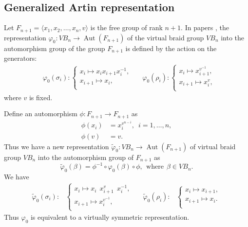 \documentclass[11 pt, reqno]{amsart}
\theoremstyle{definition}
\numberwithin{equation}{subsection}
\newcommand{\Aut}{\operatorname{Aut}}
\begin{document}

\subsection{Generalized Artin representation}\label{SS: Generalized Artin representation}

Let $F_{n+1} =\langle x_1, x_2, \ldots,x_n, v \rangle$ is the free group of rank $n+1$.
In papers \cite{Bar-1,Man}, the representation  $\varphi_0: VB_n \rightarrow \Aut(F_{n+1})$
of the virtual braid group $VB _n$ into the automorphism group of the group $F_{n+1}$ is defined by the action on the generators:
\begin{align*}
&\varphi_0(\sigma_i) :
\left\{
\begin{array}{l}
  x_i \mapsto  x_i x_{i+1} x_i^{-1}, \\
  x_{i+1} \mapsto x_i,  \\
\end{array}
\right.~~~
&\varphi_0(\rho_i) :
\left\{
\begin{array}{l}
  x_i \mapsto  x_{i+1}^{v^{-1}}, \\
  x_{i+1} \mapsto x_i^{v},  \\
\end{array}
\right.
\end{align*}
where $v$ is fixed.

Define an automorphism $\phi: F_{n+1} \to F_{n+1}$ as
\begin{align*}
\phi(x_i)&=x_i ^{v^{n-i}},\,\,\, i=1,\ldots,n,\\
\phi(v)&=v.
\end{align*}
Thus we have a new representation $\tilde{\varphi}_0: VB_n \to \Aut(F_{n+1})$ of virtual braid group $VB_n$ into the automorphism group of $F_{n+1}$ as
$$
\tilde{\varphi}_0(\beta)=\phi^{-1} \circ \varphi_0(\beta) \circ \phi, ~~\textrm{where}~~ \beta \in VB_n.
$$
We have
\begin{align*}
\tilde{\varphi}_0(\sigma_i) :&
\left\{
\begin{array}{l}
  x_i \mapsto  x_i ~~x_{i+1}^{v}~~ x_i^{-1}, \\
  x_{i+1} \mapsto x_i^{v^{-1}},  \\
\end{array}
\right.~~~
&\tilde{\varphi}_0(\rho_i) :&
\left\{
\begin{array}{l}
  x_i \mapsto  x_{i+1}, \\
  x_{i+1} \mapsto x_i.  \\
\end{array}
\right.
\end{align*}
 Thus $\varphi_0$ is equivalent to a virtually symmetric representation.
\end{document}
